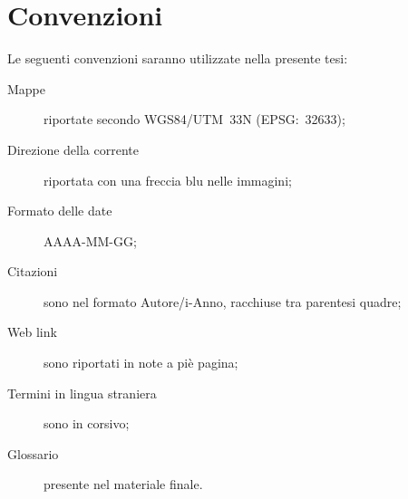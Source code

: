 \section{Convenzioni}
Le seguenti convenzioni saranno utilizzate nella presente tesi:
\begin{description}
	\item[Mappe] riportate secondo WGS84/UTM~33N (EPSG:~32633);
	\item[Direzione della corrente] riportata con una freccia blu nelle immagini;
	\item[Formato delle date] AAAA-MM-GG;
	\item[Citazioni] sono nel formato Autore/i-Anno, racchiuse tra parentesi quadre;
	\item[Web link] sono riportati in note a piè pagina;
	\item[Termini in lingua straniera] sono in corsivo;
	\item[Glossario] presente nel materiale finale.
\end{description}




